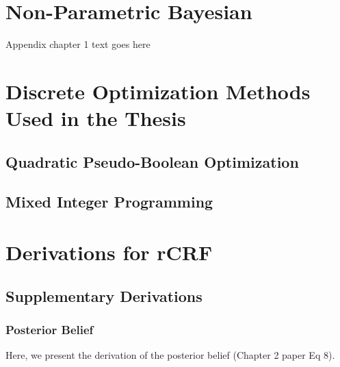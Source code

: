 \chapter{Non-Parametric Bayesian}
Appendix chapter 1 text goes here

\chapter{Discrete Optimization Methods Used in the Thesis}
\section{Quadratic Pseudo-Boolean Optimization}
\section{Mixed Integer Programming}

\chapter{Derivations for rCRF}
\section{Supplementary Derivations}
\subsection{Posterior Belief}
Here, we present the derivation of the posterior belief (Chapter 2 paper Eq 8).


